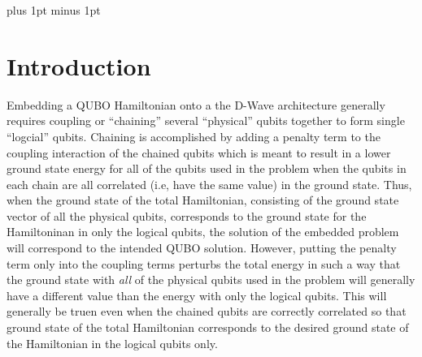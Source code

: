 \documentclass[preprint,12pt,eqsecnum,nofootinbib,amsmath,amssymb]{revtex4}
\newcommand{\bodyskip}{\baselineskip 18pt plus 1pt minus 1pt}
\begin{document}
\newpage
\bodyskip

\pagebreak
\clearpage
%
\section{Introduction}

Embedding a QUBO Hamiltonian onto a the D-Wave architecture generally requires
coupling or ``chaining'' several ``physical'' qubits together to form single ``logcial'' 
qubits. Chaining is accomplished by adding a penalty term to the coupling 
interaction of the chained qubits which is meant to result in a lower ground
state energy for all of the qubits used in the problem when the qubits in each chain 
are all correlated (i.e, have the same value) in the ground state. Thus, when the ground 
state of the total Hamiltonian, consisting of the ground state vector of all the physical qubits, 
corresponds to the ground state for the Hamiltoninan in only the logical qubits, the solution of 
the embedded problem will correspond to the intended QUBO solution. However, putting the penalty 
term only into the coupling terms perturbs the total energy in such a way that the ground state
with {\em all} of the physical qubits used in the problem will generally have a
different value than the energy with only the logical qubits. This will generally be truen even 
when the chained qubits are correctly correlated so that ground state of the total Hamiltonian 
corresponds to the desired ground state of the Hamiltonian in the logical qubits only. 
\end{document}
